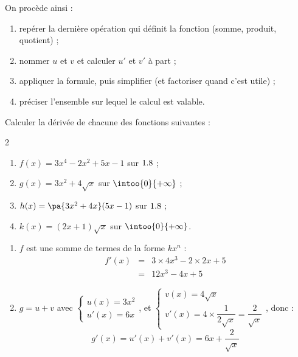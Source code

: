 \begin{methode}
	On procède ainsi :
	\begin{enumerate}
		\item repérer la dernière opération qui définit la fonction (somme, produit, quotient) ;
		\item nommer $u$ et $v$ et calculer $u'$ et $v'$ à part ;
		\item appliquer la formule, puis simplifier (et factoriser quand c'est utile) ;
		\item préciser l'ensemble sur lequel le calcul est valable.
	\end{enumerate}
\end{methode}
\begin{ex}
	Calculer la dérivée de chacune des fonctions suivantes :
	\begin{multicols}{2}
		\begin{enumerate}[label=\alph*)]
			\item $f(x) = 3x^4 - 2x^2 + 5x - 1$ sur $1.8$ ;
			\item $g(x) = 3x^2 + 4\sqrt{x}$ sur $\intoo{0}{+\infty}$ ;
			\item $h(x) = \pa{3x^2 + 4x}(5x - 1)$ sur $1.8$ ;
			\item $k(x) = (2x + 1)\sqrt{x}$ sur $\intoo{0}{+\infty}$.
		\end{enumerate}
	\end{multicols}

	\begin{correction}
		\nline
		\begin{enumerate}[label=\alph*)]
			\item $f$ est une somme de termes de la forme $kx^n$ :
			      \[
				      \begin{array}{rcl}
					      f'(x) & = & 3 \times 4x^3 - 2 \times 2x + 5 \\
					            & = & 12x^3 - 4x + 5
				      \end{array}
			      \]

			\item $g = u + v$ avec $\begin{cases}u(x) = 3x^2\\u'(x) = 6x\end{cases}$, et $\begin{cases}v(x) = 4\sqrt{x}\\v'(x) = 4 \times \dfrac{1}{2\sqrt{x}} = \dfrac{2}{\sqrt{x}}\end{cases}$, donc :
			      \[
				      g'(x) = u'(x) + v'(x) = 6x + \dfrac{2}{\sqrt{x}}
			      \]


\end{enumerate}
\end{correction}
\end{ex}
